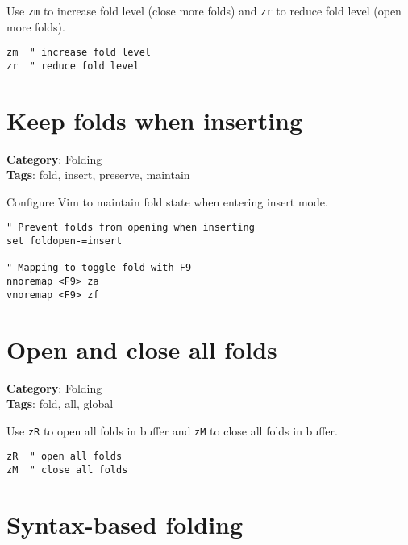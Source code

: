 {{{{{Use {\footnotesize \Verb§zm§} to increase fold level (close more folds) and {\footnotesize \Verb§zr§} to reduce fold level (open more folds).

\begin{Exa*}{}
\begin{Verbatim}[fontsize=\footnotesize, breaklines, breakanywhere]
zm  " increase fold level
zr  " reduce fold level
\end{Verbatim}
\end{Exa*}

\section{Keep folds when inserting}

\textbf{Category}: Folding\\ \textbf{Tags}: fold, insert, preserve, maintain
\vspace{0.5cm}

Configure Vim to maintain fold state when entering insert mode.

\begin{Exa*}{}
\begin{Verbatim}[fontsize=\footnotesize, breaklines, breakanywhere]
" Prevent folds from opening when inserting
set foldopen-=insert

" Mapping to toggle fold with F9
nnoremap <F9> za
vnoremap <F9> zf
\end{Verbatim}
\end{Exa*}

\section{Open and close all folds}

\textbf{Category}: Folding\\ \textbf{Tags}: fold, all, global
\vspace{0.5cm}

Use {\footnotesize \Verb§zR§} to open all folds in buffer and {\footnotesize \Verb§zM§} to close all folds in buffer.

\begin{Exa*}{}
\begin{Verbatim}[fontsize=\footnotesize, breaklines, breakanywhere]
zR  " open all folds
zM  " close all folds
\end{Verbatim}
\end{Exa*}

\section{Syntax-based folding}

}}}}}
